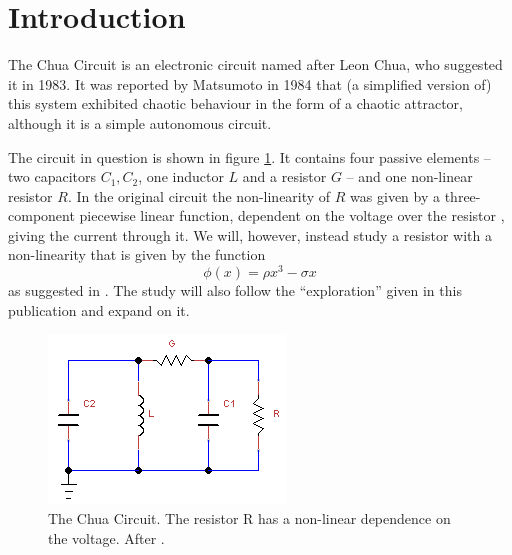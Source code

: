 \section{Introduction}

The Chua Circuit is an electronic circuit named after Leon Chua, who
suggested it in 1983.  It was reported by Matsumoto in 1984
\cite{Matsumoto84} that (a simplified version of) this system
exhibited chaotic behaviour in the form of a chaotic attractor,
although it is a simple autonomous circuit.

The circuit in question is shown in figure \ref{fig:circuit}.  It
contains four passive elements -- two capacitors $C_1, C_2$, one
inductor $L$ and a resistor $G$ -- and one non-linear resistor $R$.
In the original circuit the non-linearity of $R$ was given by a
three-component piecewise linear function, dependent on the voltage
over the resistor \cite{Matsumoto84,Matsumoto85,Chua86}, giving the
current through it.  We will, however, instead study a resistor with a
non-linearity that is given by the function
\begin{equation}
  \label{eq:non-linearity}
  \phi(x) = \rho x^3 - \sigma x
\end{equation}
as suggested in \cite[p. 379]{hirsch12}.  The study will also follow
the ``exploration'' given in this publication and expand on it.

\begin{figure}[h]
  \centering
  \includegraphics{chuacircuit.png}
  \caption{The Chua Circuit.  The resistor R has a non-linear dependence on the voltage.  After \cite{Matsumoto84,Matsumoto85}.}
  \label{fig:circuit}
\end{figure}

